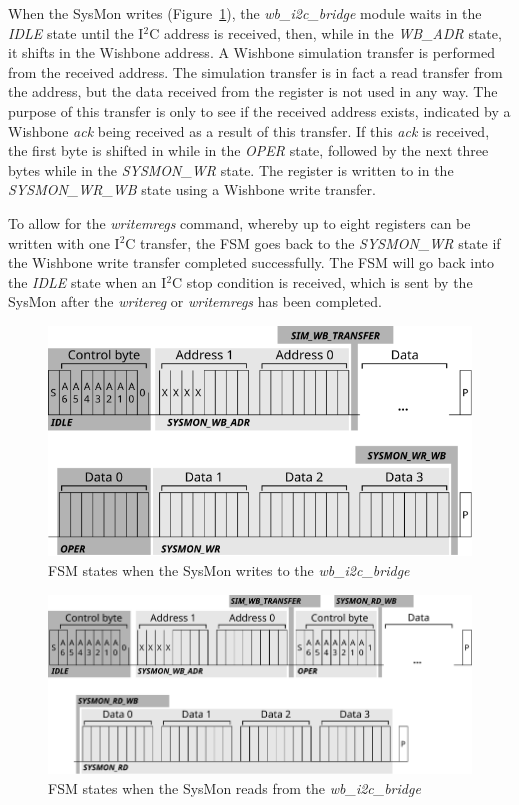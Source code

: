 \documentclass[a4paper,11pt]{article}
\begin{document}
When the SysMon writes (Figure~\ref{fig:sysmon-wr-fsm}), the
\textit{wb\_i2c\_bridge} module waits in the \textit{IDLE} state until
the I$^2$C address is received, then, while in the \textit{WB\_ADR} state,
it shifts in the Wishbone address. A Wishbone simulation transfer is performed
from the received address. The simulation transfer is in fact a read transfer
from the address, but the data received from the register is not used in any way.
The purpose of this transfer is only to see if the received address exists, indicated
by a Wishbone \textit{ack} being received as a result of this transfer. If this
\textit{ack} is received, the first byte is shifted in while in the \textit{OPER}
state, followed by the next three bytes while in the \textit{SYSMON\_WR} state. The
register is written to in the \textit{SYSMON\_WR\_WB} state using a Wishbone write
transfer.

To allow for the \textit{writemregs} command, whereby up to eight registers can be
written with one I$^2$C transfer, the FSM goes back to the \textit{SYSMON\_WR} state
if the Wishbone write transfer completed successfully. The FSM will go back into the
\textit{IDLE} state when an I$^2$C stop condition is received, which is sent by
the SysMon after the \textit{writereg} or \textit{writemregs} has been completed.

\begin{figure}[h]
  \centerline{\includegraphics[width=\textwidth]{fig/sysmon-wr-fsm}}
  \caption{FSM states when the SysMon writes to the \textit{wb\_i2c\_bridge}}
  \label{fig:sysmon-wr-fsm}
\end{figure}

\begin{figure}[h]
  \centerline{\includegraphics[width=\textwidth]{fig/sysmon-rd-fsm}}
  \caption{FSM states when the SysMon reads from the \textit{wb\_i2c\_bridge}}
  \label{fig:sysmon-rd-fsm}
\end{figure}
\end{document}
